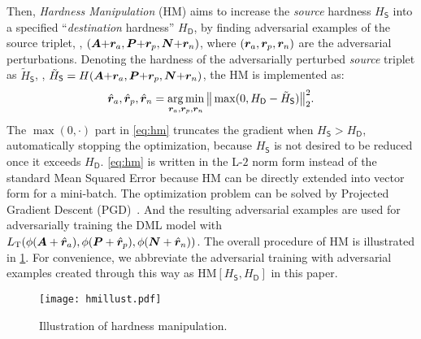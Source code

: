 \documentclass[10pt,twocolumn,letterpaper]{article}
\begin{document}
Then, \emph{Hardness Manipulation} (HM) aims to increase the \emph{source}
hardness $H_\mathsf{S}$ into a specified ``\emph{destination} hardness''
$H_\mathsf{D}$, by finding adversarial examples of the source triplet, \ie,
$({\bm{A}}{+} {{\bm{r}}}_a, {\bm{P}} {+} {{\bm{r}}}_p, {\bm{N}} {+} {{\bm{r}}}_n)$, where $({{\bm{r}}}_a, {{\bm{r}}}_p,
{{\bm{r}}}_n)$ are the adversarial perturbations.
%
Denoting the hardness of the adversarially perturbed \emph{source} triplet
as $\tilde{H}_\mathsf{S}$, \ie,
%
$\tilde{H}_\mathsf{S} = H({\bm{A}}{+} {{\bm{r}}}_a, {\bm{P}} {+} {{\bm{r}}}_p, {\bm{N}} {+} {{\bm{r}}}_n)$,
%
the HM is implemented as:
%
\begin{equation}
	\hat{{\bm{r}}}_a, \hat{{\bm{r}}}_p, \hat{{\bm{r}}}_n = \operatorname*{arg\,min}_{{\bm{r}}_a,{\bm{r}}_p,{\bm{r}}_n}
	\big\|\max(0, H_\mathsf{D} - \tilde{H}_\mathsf{S} ) \big\|_2^2.
	\label{eq:hm}
\end{equation}
%
The $\max(0,\cdot)$ part in \cref{eq:hm} truncates the gradient when
$H_\mathsf{S}>H_\mathsf{D}$, automatically stopping the optimization, because
$H_\mathsf{S}$ is not desired to be reduced once it exceeds $H_\mathsf{D}$.
%
 \cref{eq:hm} is written in the L-$2$ norm form instead of the standard Mean
Squared Error because HM can be directly extended into vector form for a
mini-batch.
%
The optimization problem can be solved by Projected Gradient Descent
(PGD)~\cite{madry}.
%
And the resulting adversarial examples are used for adversarially training the
DML model with
%
$L_\text{T}(\phi({\bm{A}}+\hat{{\bm{r}}}_a), \phi({\bm{P}}+\hat{{\bm{r}}}_p),
\phi({\bm{N}}+\hat{{\bm{r}}}_n))$.
%
The overall procedure of HM is illustrated in \cref{fig:hm}.
%
For convenience,
we abbreviate the adversarial training with adversarial examples created
through this way as $\text{HM}[H_\mathsf{S},H_\mathsf{D}]$ in this paper.

\begin{figure}
	\texttt{[image: hmillust.pdf]}
	\vspace{-1.8em}
	\caption{Illustration of hardness manipulation.}
	\label{fig:hm}
\end{figure}

\end{document}
